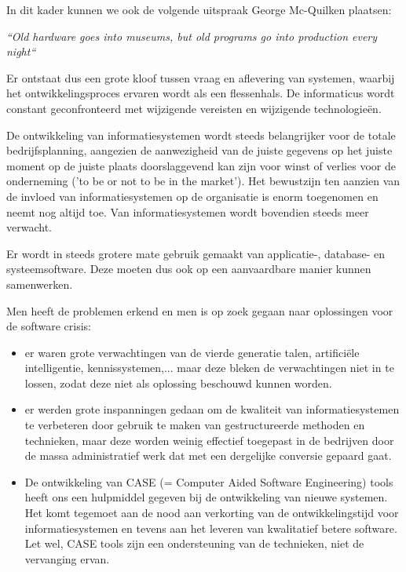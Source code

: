 In dit kader kunnen we ook de volgende uitspraak George Mc-Quilken plaatsen:

\textit{\textquotedblleft Old hardware goes into museums, but old programs go into production every night\textquotedblleft}

Er ontstaat dus een grote kloof tussen vraag en aflevering van systemen, waarbij het ontwikkelingsproces ervaren wordt als een flessenhals. De informaticus wordt constant geconfronteerd met wijzigende vereisten en wijzigende technologieën.


De ontwikkeling van informatiesystemen wordt steeds belangrijker voor de totale bedrijfsplanning, aangezien de aanwezigheid van de juiste gegevens op het juiste moment op de juiste plaats doorslaggevend kan zijn voor winst of verlies voor de onderneming ('to be or not to be in the market').
Het bewustzijn ten aanzien van de invloed van informatiesystemen op de organisatie is enorm toegenomen en neemt nog altijd toe. Van informatiesystemen wordt bovendien steeds meer verwacht.

Er wordt in steeds grotere mate gebruik gemaakt van applicatie-, database- en systeemsoftware. Deze moeten dus ook op een aanvaardbare manier kunnen samenwerken.

Men heeft de problemen erkend en men is op zoek gegaan naar oplossingen voor de software crisis:

\begin{itemize}
    \item er waren grote verwachtingen van de vierde generatie talen, artificiële intelligentie, kennissystemen,... maar deze bleken de verwachtingen niet in te lossen, zodat deze niet als oplossing beschouwd kunnen worden.
    \item er werden grote inspanningen gedaan om de kwaliteit van informatiesystemen te verbeteren door gebruik te maken van gestructureerde methoden en technieken, maar deze worden weinig effectief toegepast in de bedrijven door de massa administratief werk dat met een dergelijke conversie gepaard gaat.
    \item De ontwikkeling van CASE (= Computer Aided Software Engineering) tools heeft ons een hulpmiddel gegeven bij de ontwikkeling van nieuwe systemen. Het komt tegemoet aan de nood aan verkorting van de
ontwikkelingstijd voor informatiesystemen en tevens aan het leveren van kwalitatief betere software. Let wel, CASE tools zijn een ondersteuning van de technieken, niet de vervanging ervan.
\end{itemize}

